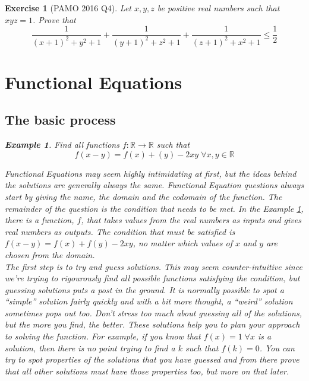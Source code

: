 \documentclass[a4paper,12pt]{article}
\newtheorem{example}{Example}[section]
\newtheorem{exercise}{Exercise}[section]
\begin{document}
\begin{exercise}[PAMO 2016 Q4]
    Let $x, y, z$ be positive real numbers such that $xyz = 1$. Prove that
    $$ \frac{1}{(x + 1)^2 + y^2 + 1} + \frac{1}{(y + 1)^2 + z^2 + 1} + \frac{1}{(z + 1)^2 + x^2 + 1} \le \frac{1}{2}$$

\clearpage

\section{Functional Equations}
\subsection{The basic process}
\begin{example}
    \label{funcex}
    Find all functions $f: \mathbb{R} \rightarrow \mathbb{R}$ such that $$f(x - y) = f(x) + (y) - 2xy\; \forall x, y \in \mathbb{R}$$
\end{example}

Functional Equations may seem highly intimidating at first, but the ideas behind the solutions are generally always the same.
Functional Equation questions always start by giving the name, the domain and the codomain of the function. The remainder of the question is the condition that needs to be met.
In the Example \ref{funcex}, there is a function, $f$, that takes values from the real numbers as inputs and gives real numbers as outputs. The condition that must be satisfied is $f(x - y) = f(x) + f(y) - 2xy$, no matter which values of $x$ and $y$ are chosen from the domain. \\

The first step is to try and guess solutions. This may seem counter-intuitive since we're trying to rigourously find all possible functions satisfying the condition, but guessing solutions puts a post in the ground. It is normally possible to spot a ``simple'' solution fairly quickly and with a bit more thought, a ``weird'' solution sometimes pops out too.
Don't stress too much about guessing \emph{all} of the solutions, but the more you find, the better. These solutions help you to plan your approach to solving the function. For example, if you know that $f(x) = 1\; \forall x$ is a solution, then there is no point trying to find a $k$ such that $f(k) = 0$.
You can try to spot properties of the solutions that you have guessed and from there prove that all other solutions must have those properties too, but more on that later.\\


\end{exercise}
\end{document}
